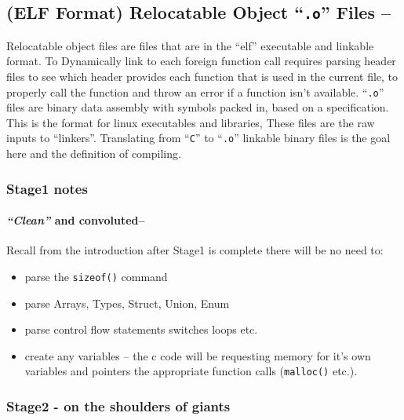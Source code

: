 \hypertarget{elf-format-relocatable-object-.o-files}{%
\subsection{\texorpdfstring{(ELF Format) Relocatable Object
``\texttt{.o}'' Files
--}{(ELF Format) Relocatable Object ``.o'' Files --}}\label{elf-format-relocatable-object-.o-files}}

Relocatable object files are files that are in the ``elf'' executable
and linkable format. To Dynamically link to each foreign function call
requires parsing header files to see which header provides each function
that is used in the current file, to properly call the function and
throw an error if a function isn't available. ``\texttt{.o}'' files are
binary data assembly with symbols packed in, based on a specification.
This is the format for linux executables and libraries, These files are
the raw inputs to ``linkers''. Translating from ``\texttt{C}'' to
``\texttt{.o}'' linkable binary files is the goal here and the
definition of compiling.

\hypertarget{stage1-notes}{%
\subsubsection{Stage1 notes}\label{stage1-notes}}

\hypertarget{clean-and-convoluted}{%
\paragraph{\texorpdfstring{\emph{``Clean''} and
convoluted--}{``Clean'' and convoluted--}}\label{clean-and-convoluted}}

Recall from the introduction after Stage1 is complete there will be no
need to:

\begin{itemize}
\tightlist
\item
  parse the \texttt{sizeof()} command
\item
  parse Arrays, Types, Struct, Union, Enum
\item
  parse control flow statements switches loops etc.
\item
  create any variables -- the c code will be requesting memory for it's
  own variables and pointers the appropriate function calls
  (\texttt{malloc()} etc.).
\end{itemize}

\hypertarget{stage2---on-the-shoulders-of-giants}{%
\subsubsection{Stage2 - on the shoulders of
giants}\label{stage2---on-the-shoulders-of-giants}}

